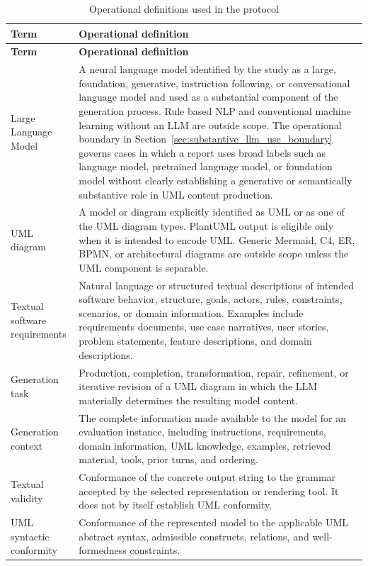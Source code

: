\begin{longtable}{p{} p{}}
\caption{Operational definitions used in the protocol}
\label{tab:protocol_definitions}\\
\toprule
\textbf{Term} & \textbf{Operational definition} \\
\midrule
\endfirsthead
\toprule
\textbf{Term} & \textbf{Operational definition} \\
\midrule
\endhead
Large Language Model & A neural language model identified by the study as a large, foundation, generative, instruction following, or conversational language model and used as a substantial component of the generation process. Rule based NLP and conventional machine learning without an LLM are outside scope. The operational boundary in Section~\ref{sec:substantive_llm_use_boundary} governs cases in which a report uses broad labels such as language model, pretrained language model, or foundation model without clearly establishing a generative or semantically substantive role in UML content production. \\
UML diagram & A model or diagram explicitly identified as UML or as one of the UML diagram types. PlantUML output is eligible only when it is intended to encode UML. Generic Mermaid, C4, ER, BPMN, or architectural diagrams are outside scope unless the UML component is separable. \\
Textual software requirements & Natural language or structured textual descriptions of intended software behavior, structure, goals, actors, rules, constraints, scenarios, or domain information. Examples include requirements documents, use case narratives, user stories, problem statements, feature descriptions, and domain descriptions. \\
Generation task & Production, completion, transformation, repair, refinement, or iterative revision of a UML diagram in which the LLM materially determines the resulting model content. \\
Generation context & The complete information made available to the model for an evaluation instance, including instructions, requirements, domain information, UML knowledge, examples, retrieved material, tools, prior turns, and ordering. \\
Textual validity & Conformance of the concrete output string to the grammar accepted by the selected representation or rendering tool. It does not by itself establish UML conformity. \\
UML syntactic conformity & Conformance of the represented model to the applicable UML abstract syntax, admissible constructs, relations, and well-formedness constraints. \\

\end{longtable}
